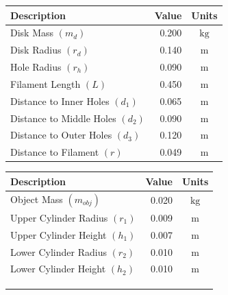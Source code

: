 \documentclass[a4paper]{article}
\begin{document}
\begin{figure}[h]
	\centering
	\begin{minipage}{0.45\textwidth}
		\centering
		\small
		\begin{tabular}{lrc}
			\toprule
			Description & Value & Units \\
			\midrule
			Disk Mass $(m_d)$ & 0.200 & $\si{\kilogram}$\\
			Disk Radius $(r_d)$ & 0.140 & $\si{\meter}$ \\
			Hole Radius $(r_h)$ & 0.090 & $\si{\meter}$ \\
			Filament Length $(L)$ & 0.450 & $\si{\meter}$ \\
			Distance to Inner Holes $(d_1)$ & 0.065 & $\si{\meter}$\\
			Distance to Middle Holes $(d_2)$ & 0.090 & $\si{\meter}$\\
			Distance to Outer Holes $(d_3)$ & 0.120 & $\si{\meter}$\\
			Distance to Filament $(r)$ & 0.049 & $\si{\meter}$ \\
			\bottomrule
		\end{tabular}
	\end{minipage}
	\hspace{1cm}
	\begin{minipage}{0.45\textwidth}
		\centering
		\small
		\begin{tabular}{lrc}
			\toprule
			Description & Value & Units \\
			\midrule
			Object Mass $(m_{obj})$ & 0.020 & $\si{\kilogram}$ \\
			Upper Cylinder Radius $(r_1)$ & 0.009 & $\si{\meter}$ \\
			Upper Cylinder Height $(h_1)$ & 0.007 & $\si{\meter}$ \\
			Lower Cylinder Radius $(r_2)$ & 0.010 & $\si{\meter}$ \\
			Lower Cylinder Height $(h_2)$ & 0.010 & $\si{\meter}$ \\
			 & & \\
			 & & \\
			 & & \\
			\bottomrule
		\end{tabular}
	\end{minipage}
\end{figure}
\end{document}
